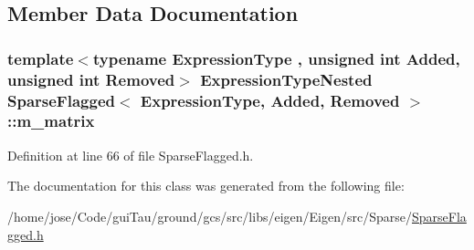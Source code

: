\subsection{Member Data Documentation}
\hypertarget{class_sparse_flagged_aa4693666391f31393215b87bee59d7c9}{
\subsubsection[{m\-\_\-matrix}]{\setlength{\rightskip}{0pt plus 5cm}template$<$typename Expression\-Type , unsigned int Added, unsigned int Removed$>$ {\bf Expression\-Type\-Nested} {\bf Sparse\-Flagged}$<$ Expression\-Type, Added, Removed $>$\-::m\-\_\-matrix\hspace{0.3cm}{\ttfamily [protected]}}}\label{class_sparse_flagged_aa4693666391f31393215b87bee59d7c9}


Definition at line 66 of file Sparse\-Flagged.\-h.



The documentation for this class was generated from the following file\-:\begin{DoxyCompactItemize}
\item 
/home/jose/\-Code/gui\-Tau/ground/gcs/src/libs/eigen/\-Eigen/src/\-Sparse/\hyperlink{_sparse_flagged_8h}{Sparse\-Flagged.\-h}\end{DoxyCompactItemize}
